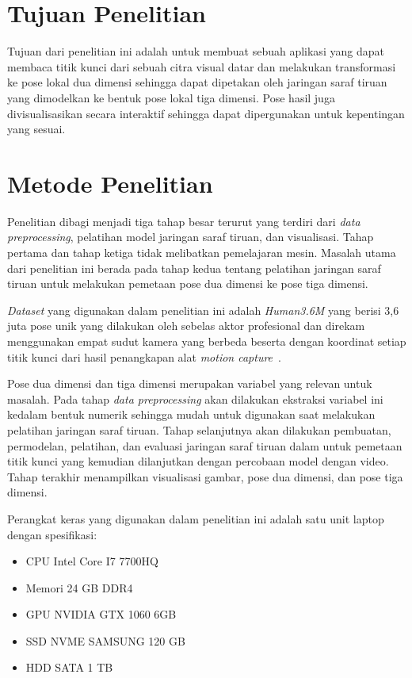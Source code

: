 \section{Tujuan Penelitian}
\label{sec:1-TujuanPenelitian}

Tujuan dari penelitian ini adalah untuk membuat sebuah aplikasi yang dapat membaca titik kunci dari
sebuah citra visual datar dan melakukan transformasi ke pose lokal dua dimensi sehingga dapat
dipetakan oleh jaringan saraf tiruan yang dimodelkan ke bentuk pose lokal tiga dimensi. Pose hasil
juga divisualisasikan secara interaktif sehingga dapat dipergunakan untuk kepentingan yang sesuai.

\section{Metode Penelitian}
\label{sec:1-MetodePenelitian}

Penelitian dibagi menjadi tiga tahap besar terurut yang terdiri dari \textit{data preprocessing},
pelatihan model jaringan saraf tiruan, dan visualisasi. Tahap pertama dan tahap ketiga tidak
melibatkan pemelajaran mesin. Masalah utama dari penelitian ini berada pada tahap kedua tentang
pelatihan jaringan saraf tiruan untuk melakukan pemetaan pose dua dimensi ke pose tiga dimensi.

\textit{Dataset} yang digunakan dalam penelitian ini adalah \textit{Human3.6M} yang berisi 3,6 juta
pose unik yang dilakukan oleh sebelas aktor profesional dan direkam menggunakan empat sudut kamera
yang berbeda beserta dengan koordinat setiap titik kunci dari hasil penangkapan alat
\textit{motion capture}~\cite{h36m_pami}.

Pose dua dimensi dan tiga dimensi merupakan variabel yang relevan untuk masalah. Pada tahap
\textit{data preprocessing} akan dilakukan ekstraksi variabel ini kedalam bentuk numerik sehingga
mudah untuk digunakan saat melakukan pelatihan jaringan saraf tiruan. Tahap selanjutnya akan
dilakukan pembuatan, permodelan, pelatihan, dan evaluasi jaringan saraf tiruan dalam untuk
pemetaan titik kunci yang kemudian dilanjutkan dengan percobaan model dengan video. Tahap terakhir
menampilkan visualisasi gambar, pose dua dimensi, dan pose tiga dimensi.

Perangkat keras yang digunakan dalam penelitian ini adalah satu unit laptop dengan spesifikasi:
\begin{itemize}
  \item CPU Intel Core I7 7700HQ
  \item Memori 24 GB DDR4
  \item GPU NVIDIA GTX 1060 6GB
  \item SSD NVME SAMSUNG 120 GB
  \item HDD SATA 1 TB
\end{itemize}

